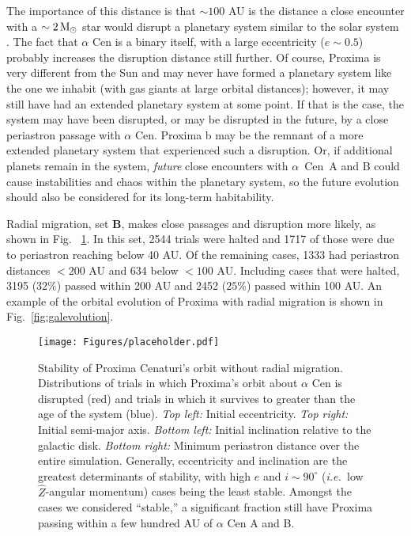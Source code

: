 \documentclass[preprint,12pt]{aastex}
\def\msun{{\rm\,M_\odot}}
\def\ie{{\it i.e.\ }}
\def\acen{{$\alpha$~Cen}}
\begin{document}
The importance of this distance is that $\sim 100$ AU is the distance a close
encounter with a $\sim 2\msun$ star would disrupt a planetary system
similar to the solar system \citep{Kaib13}. The fact that $\alpha$ Cen
is a binary itself, with a large eccentricity ($e \sim 0.5$) probably
increases the disruption distance still further.  Of course, Proxima
is very different from the Sun and may never have formed a planetary
system like the one we inhabit (with gas giants at large orbital
distances); however, it may still have had an extended planetary
system at some point. If that is the case, the system may have been
disrupted, or may be disrupted in the future, by a close periastron
passage with $\alpha$ Cen. Proxima b may be the remnant of a more
extended planetary system that experienced such a disruption. Or, if 
additional planets remain in the system, \emph{future} close encounters
with \acen~A and B could cause instabilities and chaos within the 
planetary system, so the future evolution should also be considered
for its long-term habitability.

Radial migration, set \textbf{B}, makes close passages and disruption
more likely, as shown in Fig.~ \ref{fig:galacdist}. In this set, 2544
trials were halted and 1717 of those were due to periastron reaching
below 40 AU. Of the remaining cases, 1333 had periastron distances $<
200$ AU and 634 below $<100$ AU. Including cases that were halted,
3195 ($32\%$) passed within 200 AU and 2452 ($25\%$) passed within 100
AU.  An example of the orbital evolution of Proxima with radial
migration is shown in Fig.~\ref{fig:galevolution}.

\begin{figure}
\centering
\texttt{[image: Figures/placeholder.pdf]}
\caption{Stability of Proxima Cenaturi's orbit without radial
  migration. Distributions of trials in which Proxima's orbit about
  $\alpha$ Cen is disrupted (red) and trials in which it survives to
  greater than the age of the system (blue). {\it Top left:} Initial
  eccentricity. {\it Top right:} Initial semi-major axis. {\it Bottom
    left:} Initial inclination relative to the galactic disk. {\it
    Bottom right:} Minimum periastron distance over the entire
  simulation. Generally, eccentricity and inclination are the greatest
  determinants of stability, with high $e$ and $i \sim 90^{\circ}$
  (\ie low $\hat{Z}$-angular momentum) cases being the least stable.
  Amongst the cases we considered ``stable,'' a significant fraction
  still have Proxima passing within a few hundred AU of $\alpha$ Cen A
  and B.}
\label{fig:galacdist}
\end{figure}
\end{document}
